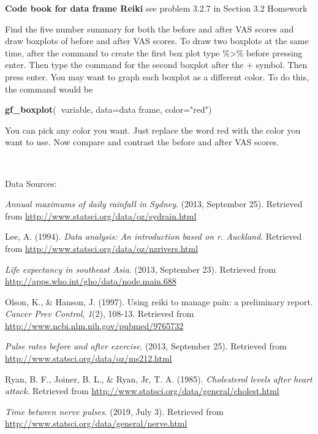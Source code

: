 \documentclass[
]{book}
\newenvironment{Shaded}{\begin{snugshade}}{\end{snugshade}}
\newcommand{\DataTypeTok}[1]{\textcolor[rgb]{0.13,0.29,0.53}{#1}}
\newcommand{\KeywordTok}[1]{\textcolor[rgb]{0.13,0.29,0.53}{\textbf{#1}}}
\newcommand{\NormalTok}[1]{#1}
\newcommand{\OperatorTok}[1]{\textcolor[rgb]{0.81,0.36,0.00}{\textbf{#1}}}
\newcommand{\StringTok}[1]{\textcolor[rgb]{0.31,0.60,0.02}{#1}}
\begin{document}
\textbf{Code book for data frame Reiki} see problem 3.2.7 in Section 3.2 Homework

Find the five number summary for both the before and after VAS scores and draw boxplots of before and after VAS scores. To draw two boxplots at the same time, after the command to create the first box plot type \%\textgreater\% before pressing enter. Then type the command for the second boxplot after the + symbol. Then press enter. You may want to graph each boxplot as a different color. To do this, the command would be

\begin{Shaded}
\begin{Highlighting}[]
\KeywordTok{gf_boxplot}\NormalTok{(}\OperatorTok{~}\NormalTok{variable, }\DataTypeTok{data=}\NormalTok{data frame, }\DataTypeTok{color=}\StringTok{"red"}\NormalTok{)}
\end{Highlighting}
\end{Shaded}

You can pick any color you want. Just replace the word red with the color you want to use.
Now compare and contrast the before and after VAS scores.

\textbf{\\
}

Data Sources:

\emph{Annual maximums of daily rainfall in Sydney}. (2013, September 25).
Retrieved from \url{http://www.statsci.org/data/oz/sydrain.html}

Lee, A. (1994). \emph{Data analysis: An introduction based on r. Auckland}.
Retrieved from \url{http://www.statsci.org/data/oz/nzrivers.html}

\emph{Life expectancy in southeast Asia}. (2013, September 23). Retrieved
from \url{http://apps.who.int/gho/data/node.main.688}

Olson, K., \& Hanson, J. (1997). Using reiki to manage pain: a
preliminary report. \emph{Cancer Prev Control}, \emph{1}(2), 108-13. Retrieved
from \url{http://www.ncbi.nlm.nih.gov/pubmed/9765732}

\emph{Pulse rates before and after exercise}. (2013, September 25). Retrieved
from \url{http://www.statsci.org/data/oz/ms212.html}

Ryan, B. F., Joiner, B. L., \& Ryan, Jr, T. A. (1985). \emph{Cholesterol
levels after heart attack}. Retrieved from
\url{http://www.statsci.org/data/general/cholest.html}

\emph{Time between nerve pulses}. (2019, July 3). Retrieved from
\url{http://www.statsci.org/data/general/nerve.html}
\end{document}
